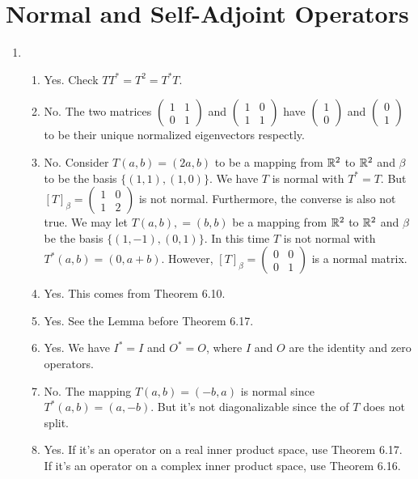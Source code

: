 \section{Normal and Self-Adjoint Operators}
\begin{enumerate}
\item \begin{enumerate}
\item Yes. Check $TT^*=T^2=T^*T$.
\item No. The two matrices $\begin{pmatrix}1&1\\0&1\end{pmatrix}$ and $\begin{pmatrix}1&0\\1&1\end{pmatrix}$ have $\begin{pmatrix}1\\0\end{pmatrix}$ and $\begin{pmatrix}0\\1\end{pmatrix}$ to be their unique normalized eigenvectors respectly.
\item No. Consider $T(a,b)=(2a,b)$ to be a mapping from $\mathbb{R}^2$ to $\mathbb{R}^2$ and $\beta $ to be the basis $\{(1,1),(1,0)\}$. We have $T$ is normal with $T^*=T$. But $[T]_{\beta}=\begin{pmatrix}1&0\\1&2\end{pmatrix}$ is not normal. Furthermore, the converse is also not true. We may let $T(a,b),=(b,b)$ be a mapping from $\mathbb{R}^2$ to $\mathbb{R}^2$ and $\beta $ be the basis $\{(1,-1),(0,1)\}$. In this time $T$ is not normal with $T^*(a,b)=(0,a+b)$. However, $[T]_{\beta}=\begin{pmatrix}0&0\\0&1\end{pmatrix}$ is a normal matrix.
\item Yes. This comes from Theorem 6.10.
\item Yes. See the Lemma before Theorem 6.17.
\item Yes. We have $I^*=I$ and $O^*=O$, where $I$ and $O$ are the identity and zero operators.
\item No. The mapping $T(a,b)=(-b,a)$ is normal since $T^*(a,b)=(a,-b)$. But it's not diagonalizable since the \charpoly{} of $T$ does not split.
\item Yes. If it's an operator on a real inner product space, use Theorem 6.17. If it's an operator on a complex inner product space, use Theorem 6.16.

\end{enumerate}
\end{enumerate}
